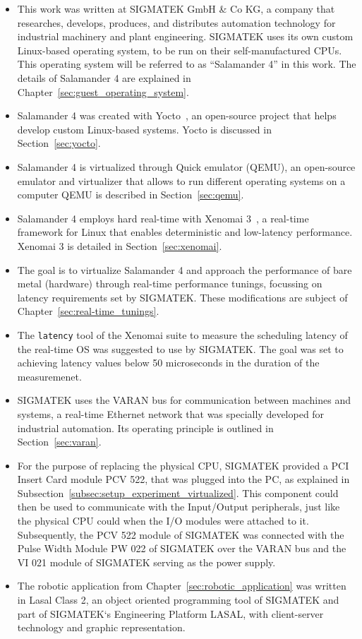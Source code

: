 \documentclass[MMR,Master,english]{twbook}
\begin{document}
\begin{itemize}
	\item This work was written at SIGMATEK GmbH \& Co KG, a company that researches, develops, produces, and distributes automation technology for industrial machinery and plant engineering. SIGMATEK uses its own custom Linux-based operating system, to be run on their self-manufactured CPUs. This operating system will be referred to as ``Salamander 4'' in this work. The details of Salamander 4 are explained in Chapter~\ref{sec:guest_operating_system}.
	\item Salamander 4 was created with Yocto~\cite{WelcomeYoctoProject}, an open-source project that helps develop custom Linux-based systems. Yocto is discussed in Section~\ref{sec:yocto}.
	\item Salamander 4 is virtualized through Quick emulator (QEMU), an open-source emulator and virtualizer that allows to run different operating systems on a computer QEMU is described in Section~\ref{sec:qemu}.
	\item Salamander 4 employs hard real-time with Xenomai 3~\cite{XenomaiXenomai}, a real-time framework for Linux that enables deterministic and low-latency performance. Xenomai 3 is detailed in Section~\ref{sec:xenomai}.
	\item The goal is to virtualize Salamander 4 and approach the performance of bare metal (hardware) through real-time performance tunings, focussing on latency requirements set by SIGMATEK. These modifications are subject of Chapter~\ref{sec:real-time_tunings}.
	\item The \texttt{latency} tool of the Xenomai suite to measure the scheduling latency of the real-time OS was suggested to use by SIGMATEK. The goal was set to achieving latency values below 50 microseconds in the duration of the measuremenet.
	\item SIGMATEK uses the VARAN bus for communication between machines and systems, a real-time Ethernet network that was specially developed for industrial automation. Its operating principle is outlined in Section~\ref{sec:varan}.
	\item For the purpose of replacing the physical CPU, SIGMATEK provided a PCI Insert Card module PCV 522, that was plugged into the PC, as explained in Subsection~\ref{subsec:setup_experiment_virtualized}. This component could then be used to communicate with the Input/Output peripherals, just like the physical CPU could when the I/O modules were attached to it. Subsequently, the PCV 522 module of SIGMATEK was connected with the Pulse Width Module PW 022 of SIGMATEK over the VARAN bus and the VI 021 module of SIGMATEK serving as the power supply.
	\item The robotic application from Chapter~\ref{sec:robotic_application} was written in Lasal Class 2, an object oriented programming tool of SIGMATEK and part of SIGMATEK`s Engineering Platform LASAL, with client-server technology and graphic representation.
\end{itemize}
\end{document}
